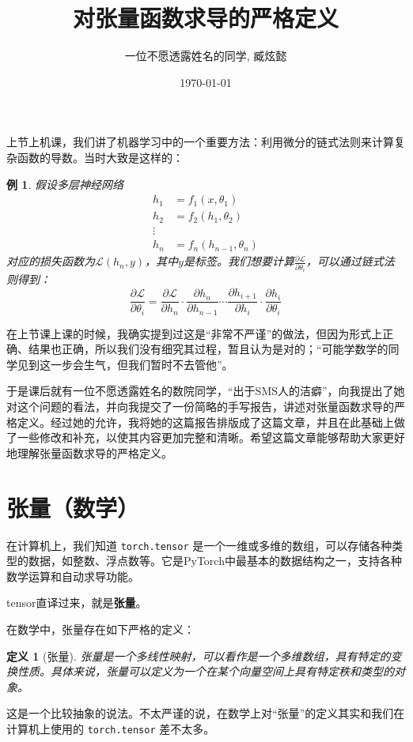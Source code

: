 \documentclass[
    UTF8,
    a4paper,
    12pt
]{ctexart}
\title{\textbf{对张量函数求导的严格定义}}
\author{一位不愿透露姓名的同学, 臧炫懿}
\date{\today}
\newtheorem{definition}{定义}
\newtheorem{example}{例}
\begin{document}
\maketitle

上节上机课，我们讲了机器学习中的一个重要方法：利用微分的链式法则来计算复杂函数的导数。当时大致是这样的：

\begin{example}
    假设多层神经网络
    \begin{align}
        h_1 &= f_1(x, \theta_1) \\
        h_2 &= f_2(h_1, \theta_2) \\
        \vdots \\
        h_n &= f_n(h_{n-1}, \theta_n)
    \end{align}
    对应的损失函数为$\mathcal{L}(h_n, y)$，其中$y$是标签。我们想要计算$\frac{\partial \mathcal{L}}{\partial \theta_i}$，可以通过链式法则得到：
    \begin{equation}
        \frac{\partial \mathcal{L}}{\partial \theta_i} = \frac{\partial \mathcal{L}}{\partial h_n} \cdot \frac{\partial h_n}{\partial h_{n-1}} \cdots \frac{\partial h_{i+1}}{\partial h_i} \cdot \frac{\partial h_i}{\partial \theta_i}
    \end{equation}
\end{example}

在上节课上课的时候，我确实提到过这是“非常不严谨”的做法，但因为形式上正确、结果也正确，所以我们没有细究其过程，暂且认为是对的；“可能学数学的同学见到这一步会生气，但我们暂时不去管他”。

于是课后就有一位不愿透露姓名的数院同学，“出于SMS人的洁癖”，向我提出了她对这个问题的看法，并向我提交了一份简略的手写报告，讲述对张量函数求导的严格定义。经过她的允许，我将她的这篇报告排版成了这篇文章，并且在此基础上做了一些修改和补充，以使其内容更加完整和清晰。希望这篇文章能够帮助大家更好地理解张量函数求导的严格定义。

\section{张量（数学）}

在计算机上，我们知道 \verb|torch.tensor| 是一个一维或多维的数组，可以存储各种类型的数据，如整数、浮点数等。它是PyTorch中最基本的数据结构之一，支持各种数学运算和自动求导功能。

tensor直译过来，就是\textbf{张量}。

在数学中，张量存在如下严格的定义：
\begin{definition}[张量]
    张量是一个多线性映射，可以看作是一个多维数组，具有特定的变换性质。具体来说，张量可以定义为一个在某个向量空间上具有特定秩和类型的对象。
\end{definition}
这是一个比较抽象的说法。不太严谨的说，在数学上对“张量”的定义其实和我们在计算机上使用的 \verb|torch.tensor| 差不太多。
\end{document}
